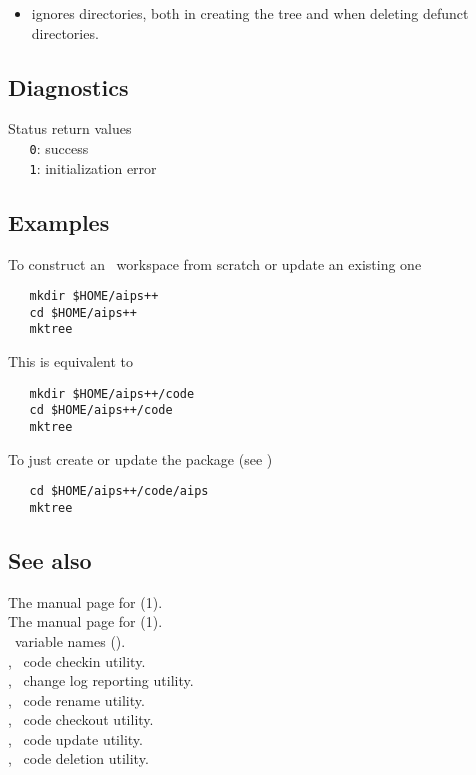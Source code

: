 \begin{itemize}
\item
    ignores  directories, both in creating the tree
   and when deleting defunct directories.
\end{itemize}

\subsection*{Diagnostics}

Status return values
\\ \verb+   0+: success
\\ \verb+   1+: initialization error

\subsection*{Examples}

To construct an \aipspp\ workspace from scratch or update an existing one

\begin{verbatim}
   mkdir $HOME/aips++
   cd $HOME/aips++
   mktree
\end{verbatim}

\noindent
This is equivalent to

\begin{verbatim}
   mkdir $HOME/aips++/code
   cd $HOME/aips++/code
   mktree
\end{verbatim}

\noindent
To just create or update the  package (see )

\begin{verbatim}
   cd $HOME/aips++/code/aips
   mktree
\end{verbatim}

\subsection*{See also}

The manual page for (1).\\
The manual page for (1).\\
\aipspp\ variable names ().\\
, \aipspp\ code checkin utility.\\
, \aipspp\ change log reporting utility.\\
, \aipspp\ code rename utility.\\
, \aipspp\ code checkout utility.\\
, \aipspp\ code update utility.\\
, \aipspp\ code deletion utility.

